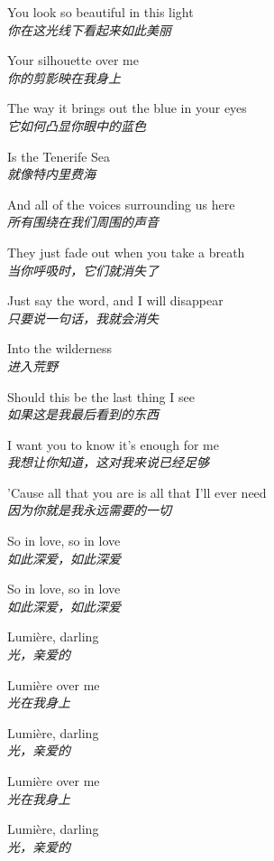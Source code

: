 \begin{spacing}{1.5}
\begin{flushleft}
You look so beautiful in this light\\
\textit{你在这光线下看起来如此美丽}\lyricspace

Your silhouette over me\\
\textit{你的剪影映在我身上}\lyricspace

The way it brings out the blue in your eyes\\
\textit{它如何凸显你眼中的蓝色}\lyricspace

Is the Tenerife Sea\\
\textit{就像特内里费海}\lyricspace

And all of the voices surrounding us here\\
\textit{所有围绕在我们周围的声音}\lyricspace

They just fade out when you take a breath\\
\textit{当你呼吸时，它们就消失了}\lyricspace

Just say the word, and I will disappear\\
\textit{只要说一句话，我就会消失}\lyricspace

Into the wilderness\\
\textit{进入荒野}\lyricspace

Should this be the last thing I see\\
\textit{如果这是我最后看到的东西}\lyricspace

I want you to know it's enough for me\\
\textit{我想让你知道，这对我来说已经足够}\lyricspace

'Cause all that you are is all that I'll ever need\\
\textit{因为你就是我永远需要的一切}\lyricspace

So in love, so in love\\
\textit{如此深爱，如此深爱}\lyricspace

So in love, so in love\\
\textit{如此深爱，如此深爱}\lyricspace

Lumière, darling\\
\textit{光，亲爱的}\lyricspace

Lumière over me\\
\textit{光在我身上}\lyricspace

Lumière, darling\\
\textit{光，亲爱的}\lyricspace

Lumière over me\\
\textit{光在我身上}\lyricspace

Lumière, darling\\
\textit{光，亲爱的}\lyricspace


\end{flushleft}
\end{spacing}
